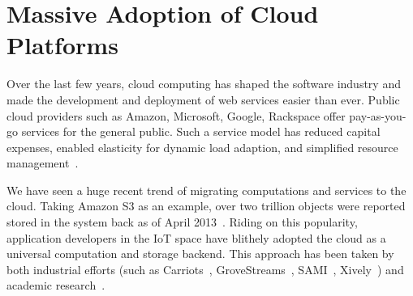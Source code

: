\section{Massive Adoption of Cloud Platforms}
\label{sec:cloud}

Over the last few years, cloud computing has shaped the software industry and
made the development and deployment of web services easier than ever.  Public
cloud providers such as Amazon, Microsoft, Google, Rackspace offer pay-as-you-go
services for the general public.  Such a service model has reduced capital
expenses, enabled elasticity for dynamic load adaption, and simplified resource
management~\cite{armbrust2010view}.

We have seen a huge recent trend of migrating computations and services to the
cloud.  Taking Amazon S3 as an example, over two trillion objects were reported
stored in the system back as of April 2013~\cite{barr2013amazon}.  Riding on
this popularity, application developers in the IoT space have blithely adopted
the cloud as a universal computation and storage backend.  This approach has
been taken by both industrial efforts (such as Carriots~\cite{carriots},
GroveStreams~\cite{grovestreams}, SAMI~\cite{sami}, Xively~\cite{xively}) and
academic research~\cite{gupta2014bolt, zachariah1001internet}.

